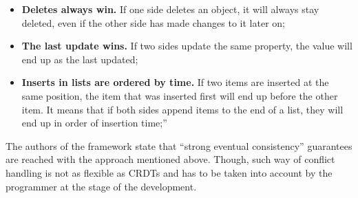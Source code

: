     \begin{itemize}
        \item {\textbf{Deletes always win.} If one side deletes an object, it will always stay deleted, even if the other side has made changes to it later on;}
        \item {\textbf{The last update wins.} If two sides update the same property, the value will end up as the last updated;}
        \item {\textbf{Inserts in lists are ordered by time.} If two items are inserted at the same position, the item that was inserted first will end up before the other item. It means that if both sides append items to the end of a list, they will end up in order of insertion time;}''\cite{22}
    \end{itemize}

The authors of the framework state that ``strong eventual consistency'' guarantees are reached\cite{22} with the approach mentioned above. Though, such way of conflict handling is not as flexible as CRDTs and has to be taken into account by the programmer at the stage of the development.